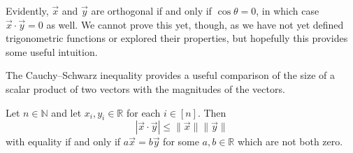 Evidently, $\vec x$ and $\vec y$ are orthogonal if and only if $\cos \theta = 0$, in which case $\vec x \cdot \vec y = 0$ as well. We cannot prove this yet, though, as we have not yet defined trigonometric functions or explored their properties, but hopefully this provides some useful intuition.

The Cauchy--Schwarz inequality provides a useful comparison of the size of a scalar product of two vectors with the magnitudes of the vectors.

\begin{theorem}
\label{thmCauchySchwarzInequality}
Let $n \in \mathbb{N}$ and let $x_i,y_i \in \mathbb{R}$ for each $i \in [n]$. Then
\[ |\vec x \cdot \vec y| \le \lVert \vec x \rVert \lVert \vec y \rVert \]
with equality if and only if $a\vec x = b\vec y$ for some $a,b \in \mathbb{R}$ which are not both zero.
\end{theorem}
